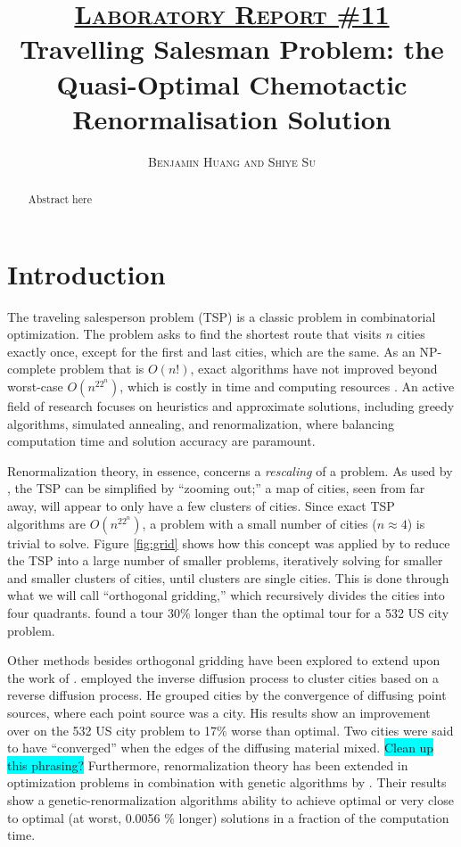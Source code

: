 \documentclass[10pt]{article}
\title{\vspace{-2cm} \textsc{\underline{Laboratory Report \#11}} \\ \textbf{Travelling Salesman Problem: the Quasi-Optimal Chemotactic Renormalisation Solution} \vspace{-0.5cm}}
\author{\textsc{Benjamin Huang and Shiye Su}}
\date{}
\newcommand{\note}[1]{\colorbox{cyan}{#1}}
\begin{document}
\maketitle

\begin{abstract}
Abstract here
\end{abstract}

\section{Introduction}

The traveling salesperson problem (TSP) is a classic problem in combinatorial optimization. The problem asks to find the shortest route that visits $n$ cities exactly once, except for the first and last cities, which are the same. As an NP-complete problem that is $O(n!)$, exact algorithms have not improved beyond worst-case $O(n^22^n)$, which is costly in time and computing resources \citep{Held1962}. An active field of research focuses on heuristics and approximate solutions, including greedy algorithms, simulated annealing, and renormalization, where balancing computation time and solution accuracy are paramount.\\

\par Renormalization theory, in essence, concerns a \textit{rescaling} of a problem. As used by \citet{Yoshiyuki1995}, the TSP can be simplified by ``zooming out;'' a map of cities, seen from far away, will appear to only have a few clusters of cities. Since exact TSP algorithms are $O(n^22^n)$, a problem with a small number of cities ($n \approx 4$) is trivial to solve. Figure \ref{fig:grid} shows how this concept was applied by \citet{Yoshiyuki1995} to reduce the TSP into a large number of smaller problems, iteratively solving for smaller and smaller clusters of cities, until clusters are single cities. This is done through what we will call ``orthogonal gridding,'' which recursively divides the cities into four quadrants. \citet{Yoshiyuki1995} found a tour 30\% longer than the optimal tour for a 532 US city problem.\\

\par Other methods besides orthogonal gridding have been explored to extend upon the work of \citet{Yoshiyuki1995}. \citet{Ugajin2002} employed the inverse diffusion process to cluster cities based on a reverse diffusion process. He grouped cities by the convergence of diffusing point sources, where each point source was a city. His results show an improvement over \citet{Yoshiyuki1999} on the 532 US city problem to 17\% worse than optimal. Two cities were said to have ``converged'' when the edges of the diffusing material mixed. \note{Clean up this phrasing?} Furthermore, renormalization theory has been extended in optimization problems in combination with genetic algorithms by \citet{Houdayer1999}. Their results show a genetic-renormalization algorithms ability to achieve optimal or very close to optimal (at worst, 0.0056 \% longer) solutions in a fraction of the computation time. \\
\end{document}

